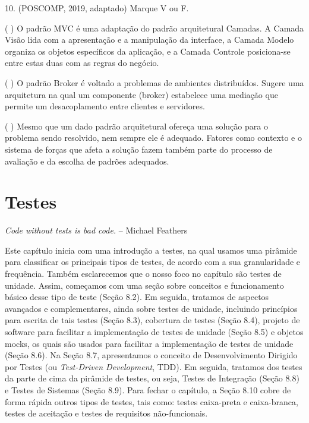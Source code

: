 \documentclass[
  11pt,
  twoside]{book}
\renewenvironment{quote}{\centering \vspace{1.5ex} \begin{tcolorbox}[colback=backcolor, width=4.9in]}{\end{tcolorbox}}
\begin{document}
10. (POSCOMP, 2019, adaptado) Marque V ou F.

( ) O padrão MVC é uma adaptação do padrão arquitetural Camadas. A
Camada Visão lida com a apresentação e a manipulação da interface, a
Camada Modelo organiza os objetos específicos da aplicação, e a Camada
Controle posiciona-se entre estas duas com as regras do negócio.

( ) O padrão Broker é voltado a problemas de ambientes distribuídos.
Sugere uma arquitetura na qual um componente (broker) estabelece uma
mediação que permite um desacoplamento entre clientes e servidores.

( ) Mesmo que um dado padrão arquitetural ofereça uma solução para o
problema sendo resolvido, nem sempre ele é adequado. Fatores como
contexto e o sistema de forças que afeta a solução fazem também parte do
processo de avaliação e da escolha de padrões adequados.

\hypertarget{testes}{%
\chapter{Testes}\label{testes}}

\begin{quote}
\emph{Code without tests is bad code.} -- Michael Feathers
\end{quote}

Este capítulo inicia com uma introdução a testes, na qual usamos uma
pirâmide para classificar os principais tipos de testes, de acordo com a
sua granularidade e frequência. Também esclarecemos que o nosso foco no
capítulo são testes de unidade. Assim, começamos com uma seção sobre
conceitos e funcionamento básico desse tipo de teste (Seção 8.2). Em
seguida, tratamos de aspectos avançados e complementares, ainda sobre
testes de unidade, incluindo princípios para escrita de tais testes
(Seção 8.3), cobertura de testes (Seção 8.4), projeto de software para
facilitar a implementação de testes de unidade (Seção 8.5) e objetos
mocks, os quais são usados para facilitar a implementação de testes de
unidade (Seção 8.6). Na Seção 8.7, apresentamos o conceito de
Desenvolvimento Dirigido por Testes (ou \emph{Test-Driven Development},
TDD). Em seguida, tratamos dos testes da parte de cima da pirâmide de
testes, ou seja, Testes de Integração (Seção 8.8) e Testes de Sistemas
(Seção 8.9). Para fechar o capítulo, a Seção 8.10 cobre de forma rápida
outros tipos de testes, tais como: testes caixa-preta e caixa-branca,
testes de aceitação e testes de requisitos não-funcionais.
\end{document}
